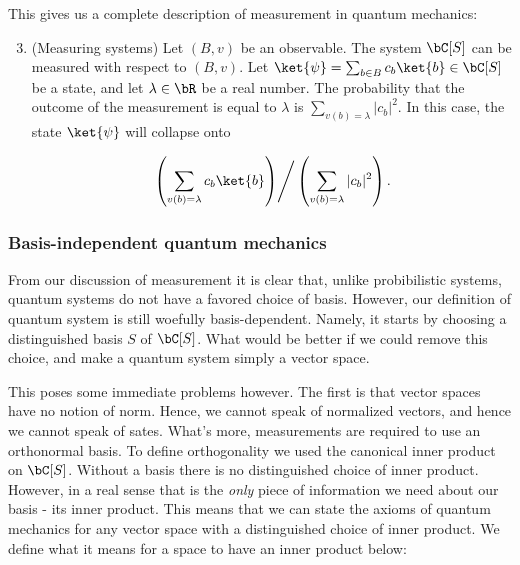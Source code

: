 This gives us a complete description of measurement in quantum mechanics:

\begin{enumerate}[1''.]
\setcounter{enumi}{2}

\item (Measuring systems) Let $(B,v)$ be an observable. The system $\bC[S]$ can be measured with respect to $(B,v)$. Let $\ket{\psi}=\sum_{b\in B}c_b \ket{b}\in \bC[S]$ be a state, and let $\lambda\in \bR$ be a real number. The probability that the outcome of the measurement is equal to $\lambda$ is $\sum_{v(b)=\lambda}|c_b|^2$. In this case, the state $\ket{\psi}$ will collapse onto

$$\left.\left(\sum_{v(b)=\lambda}c_b \ket{b}\right)\right/ \left(\sum_{v(b)=\lambda}|c_b|^2\right).$$
\end{enumerate}



\subsubsection{Basis-independent quantum mechanics}

From our discussion of measurement it is clear that, unlike probibilistic systems, quantum systems do not have a favored choice of basis. However, our definition of quantum system is still woefully basis-dependent. Namely, it starts by choosing a distinguished basis $S$ of $\bC[S]$. What would be better if we could remove this choice, and make a quantum system simply a vector space.

This poses some immediate problems however. The first is that vector spaces have no notion of norm. Hence, we cannot speak of normalized vectors, and hence we cannot speak of sates. What's more, measurements are required to use an orthonormal basis. To define orthogonality we used the canonical inner product on $\bC[S]$. Without a basis there is no distinguished choice of inner product. However, in a real sense that is the {\em only} piece of information we need about our basis - its inner product. This means that we can state the axioms of quantum mechanics for any vector space with a distinguished choice of inner product. We define what it means for a space to have an inner product below:

